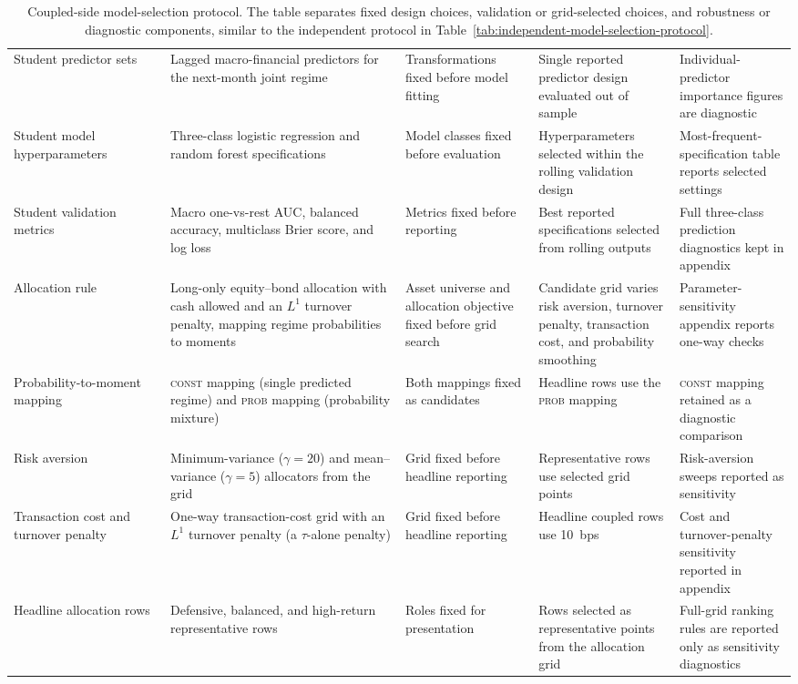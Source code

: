 \begin{table}[H]
\begin{adjustbox}{center,max width=\linewidth}
\begin{tabular}{p{0.20\linewidth}p{0.30\linewidth}p{0.17\linewidth}p{0.18\linewidth}p{0.18\linewidth}}
Student predictor sets & Lagged macro-financial predictors for the next-month joint regime & Transformations fixed before model fitting & Single reported predictor design evaluated out of sample & Individual-predictor importance figures are diagnostic \\
Student model hyperparameters & Three-class logistic regression and random forest specifications & Model classes fixed before evaluation & Hyperparameters selected within the rolling validation design & Most-frequent-specification table reports selected settings \\
Student validation metrics & Macro one-vs-rest AUC, balanced accuracy, multiclass Brier score, and log loss & Metrics fixed before reporting & Best reported specifications selected from rolling outputs & Full three-class prediction diagnostics kept in appendix \\
Allocation rule & Long-only equity--bond allocation with cash allowed and an $L^1$ turnover penalty, mapping regime probabilities to moments & Asset universe and allocation objective fixed before grid search & Candidate grid varies risk aversion, turnover penalty, transaction cost, and probability smoothing & Parameter-sensitivity appendix reports one-way checks \\
Probability-to-moment mapping & \textsc{const} mapping (single predicted regime) and \textsc{prob} mapping (probability mixture) & Both mappings fixed as candidates & Headline rows use the \textsc{prob} mapping & \textsc{const} mapping retained as a diagnostic comparison \\
Risk aversion & Minimum-variance ($\gamma{=}20$) and mean--variance ($\gamma{=}5$) allocators from the grid & Grid fixed before headline reporting & Representative rows use selected grid points & Risk-aversion sweeps reported as sensitivity \\
Transaction cost and turnover penalty & One-way transaction-cost grid with an $L^1$ turnover penalty (a $\tau$-alone penalty) & Grid fixed before headline reporting & Headline coupled rows use 10~bps & Cost and turnover-penalty sensitivity reported in appendix \\
Headline allocation rows & Defensive, balanced, and high-return representative rows & Roles fixed for presentation & Rows selected as representative points from the allocation grid & Full-grid ranking rules are reported only as sensitivity diagnostics \\
\bottomrule
\end{tabular}
\end{adjustbox}
\caption{Coupled-side model-selection protocol. The table separates fixed design choices,
validation or grid-selected choices, and robustness or diagnostic components, similar to the
independent protocol in Table~\ref{tab:independent-model-selection-protocol}.}
\label{tab:coupled-model-selection-protocol}
\end{table}

\FloatBarrier
